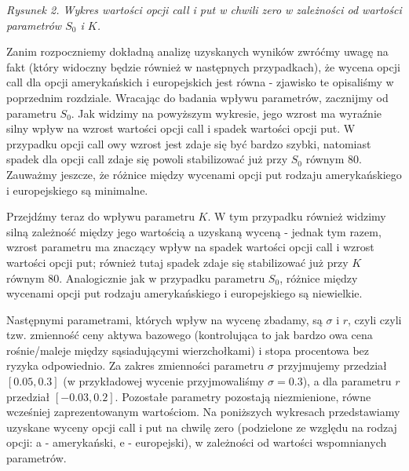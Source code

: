 \documentclass[
]{article}
\begin{document}
\emph{Rysunek 2. Wykres wartości opcji call i put w chwili zero w
zależności od wartości parametrów \(S_0\) i \(K\).}

Zanim rozpoczniemy dokładną analizę uzyskanych wyników zwróćmy uwagę na
fakt (który widoczny będzie również w następnych przypadkach), że wycena
opcji call dla opcji amerykańskich i europejskich jest równa - zjawisko
te opisaliśmy w poprzednim rozdziale. Wracając do badania wpływu
parametrów, zacznijmy od parametru \(S_0\). Jak widzimy na powyższym
wykresie, jego wzrost ma wyraźnie silny wpływ na wzrost wartości opcji
call i spadek wartości opcji put. W przypadku opcji call owy wzrost jest
zdaje się być bardzo szybki, natomiast spadek dla opcji call zdaje się
powoli stabilizować już przy \(S_0\) równym \(80\). Zauważmy jeszcze, że
różnice między wycenami opcji put rodzaju amerykańskiego i europejskiego
są minimalne.

Przejdźmy teraz do wpływu parametru \(K\). W tym przypadku również
widzimy silną zależność między jego wartością a uzyskaną wyceną - jednak
tym razem, wzrost parametru ma znaczący wpływ na spadek wartości opcji
call i wzrost wartości opcji put; również tutaj spadek zdaje się
stabilizować już przy \(K\) równym \(80\). Analogicznie jak w przypadku
parametru \(S_0\), różnice między wycenami opcji put rodzaju
amerykańskiego i europejskiego są niewielkie.

Następnymi parametrami, których wpływ na wycenę zbadamy, są \(\sigma\) i
\(r\), czyli czyli tzw. zmienność ceny aktywa bazowego (kontrolująca to
jak bardzo owa cena rośnie/maleje między sąsiadującymi wierzchołkami) i
stopa procentowa bez ryzyka odpowiednio. Za zakres zmienności parametru
\(\sigma\) przyjmujemy przedział \([0.05, 0.3]\) (w przykładowej wycenie
przyjmowaliśmy \(\sigma = 0.3\)), a dla parametru \(r\) przedział
\([-0.03, 0.2]\). Pozostałe parametry pozostają niezmienione, równe
wcześniej zaprezentowanym wartościom. Na poniższych wykresach
przedstawiamy uzyskane wyceny opcji call i put na chwilę zero
(podzielone ze względu na rodzaj opcji: a - amerykański, e -
europejski), w zależności od wartości wspomnianych parametrów.
\end{document}
